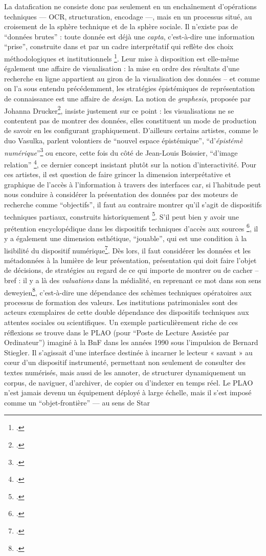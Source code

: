 La datafication ne consiste donc pas seulement en un enchaînement d’opérations techniques — OCR, structuration, encodage —, mais en un processus situé, au croisement de la sphère technique et de la sphère sociale. Il n’existe pas de \enquote{données brutes} : toute donnée est déjà une \emph{capta}, c’est-à-dire une information \enquote{prise}, construite dans et par un cadre interprétatif qui reflète des choix méthodologiques et institutionnels \footcite[][]{drucker}. Leur mise à disposition est elle-même également une affaire de visualisation : la mise en ordre des résultats d'une recherche en ligne appartient au giron de la visualisation des données -- et comme on l'a sous entendu précédemment, les stratégies épistémiques de représentation de connaissance est une affaire de \emph{design}. La notion de \emph{graphesis}, proposée par Johanna Drucker\footcite[][]{drucker}, insiste justement sur ce point : les visualisations ne se contentent pas de montrer des données, elles constituent un mode de production de savoir en les configurant graphiquement. D'ailleurs certains artistes, comme le duo Vasulka, parlent volontiers de \enquote{nouvel espace épistémique}, \enquote{d'\emph{épistémè numérique}}\footcite[][]{dallet} ou encore, cette fois du côté de Jean-Louis Boissier, \enquote{d'image relation} \footcite[][]{boissier}, ce dernier concept insistant plutôt sur la notion d'interactivité. Pour ces artistes, il est question de faire grincer la dimension interprétative et graphique de l'accès à l'information à travers des interfaces car, si l'habitude peut nous conduire à considérer la présentation des données par des moteurs de recherche comme \enquote{objectifs}, il faut au contraire montrer qu'il s'agit de dispositifs techniques partiaux, construits historiquement \footcite[][]{daston}. S'il peut bien y avoir une prétention encyclopédique dans les dispositifs techniques d'accès aux sources \footcite[][]{wagneur}, il y a également une dimension esthétique, \enquote{jouable}, qui est une condition à la lisibilité du dispositif numérique\footcite[][]{boissier}. Dès lors, il faut considérer les données et les métadonnées à la lumière de leur présentation, présentation qui doit faire l'objet de décisions, de stratégies au regard de ce qui importe de montrer ou de cacher -- bref : il y a là des \emph{valuations} dans la médialité, en reprenant ce mot dans son sens deweyien\footcite[][]{dewey}, c'est-à-dire une dépendance des schèmes techniques opératoires aux processus de formation des valeurs. Les institutions patrimoniales sont des acteurs exemplaires de cette double dépendance des dispositifs techniques aux attentes sociales ou scientifiques. Un exemple particulièrement riche de ces réflexions se trouve dans le PLAO (pour \enquote{Poste de Lecture Assistée par Ordinateur}) imaginé à la BnF dans les années 1990 sous l’impulsion de Bernard Stiegler. Il s’agissait d’une interface destinée à incarner le lecteur « savant » au cœur d’un dispositif instrumenté, permettant non seulement de consulter des textes numérisés, mais aussi de les annoter, de structurer dynamiquement un corpus, de naviguer, d’archiver, de copier ou d’indexer en temps réel. Le PLAO n’est jamais devenu un équipement déployé à large échelle, mais il s’est imposé comme un \enquote{objet-frontière} — au sens de Star 